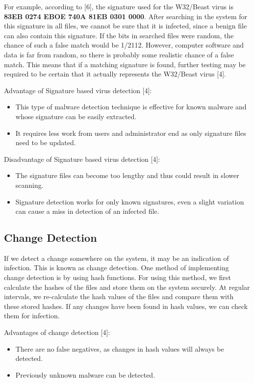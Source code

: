 For example, according to [6], the signature used for the W32/Beast virus is \textbf{83EB 0274 EBOE 740A 81EB 0301 0000}. After searching in the system for this signature in all files, we cannot be sure that it is infected, since a benign file can also contain this signature. If the bits in searched files were random, the chance of such a false match would be 1/2112. However, computer software and data is far from random, so there is probably some realistic chance of a false match. This means that if a matching signature is found, further testing may be required to be certain that it actually represents the W32/Beast virus [4].

Advantage of Signature based virus detection [4]:  
\begin{itemize}
\item This type of malware detection technique is effective for known malware and whose signature can be easily extracted.
\item It requires less work from users and administrator end as only signature files need to be updated.
\end{itemize}

Disadvantage of Signature based virus detection [4]:  
\begin{itemize}
\item The signature files can become too lengthy and thus could result in slower scanning.
\item Signature detection works for only known signatures, even a slight variation can cause a miss in detection of an infected file.
\end{itemize}

\subsection{Change Detection}
If we detect a change somewhere on the system, it may be an indication of infection. This is known as change detection. One method of implementing change detection is by using hash functions. For using this method, we first calculate the hashes of the files and store them on the system securely. At regular intervals, we re-calculate the hash values of the files and compare them with these stored hashes. If any changes have been found in hash values, we can check them for infection.

Advantages of change detection [4]:
\begin{itemize}
\item There are no false negatives, as changes in hash values will always be detected.
\item Previously unknown malware can be detected.
\end{itemize}

